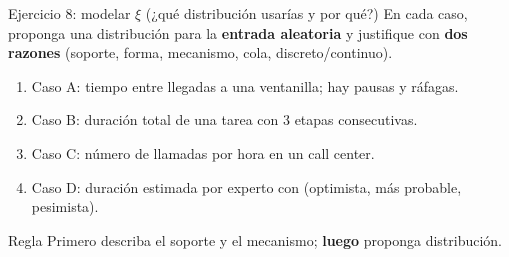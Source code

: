 \documentclass[aspectratio=1610, 9pt]{beamer}
\begin{document}
\begin{frame}{Ejercicio 8: modelar $\xi$ (¿qué distribución usarías y por qué?)}
\small
En cada caso, proponga una distribución para la \textbf{entrada aleatoria} y justifique con \textbf{dos razones}
(soporte, forma, mecanismo, cola, discreto/continuo).

\begin{enumerate}
\item Caso A: tiempo entre llegadas a una ventanilla; hay pausas y ráfagas.
\item Caso B: duración total de una tarea con 3 etapas consecutivas.
\item Caso C: número de llamadas por hora en un call center.
\item Caso D: duración estimada por experto con (optimista, más probable, pesimista).
\end{enumerate}

\begin{alertblock}{Regla}
Primero describa el soporte y el mecanismo; \textbf{luego} proponga distribución.
\end{alertblock}
\end{frame}
\end{document}
